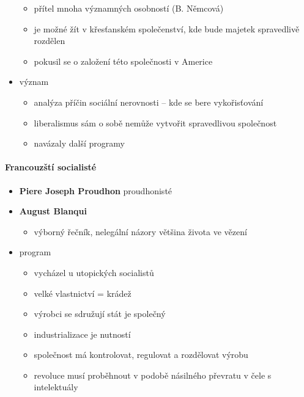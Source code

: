 \begin{itemize}
\begin{itemize}
	\item přítel mnoha významných osobností (B. Němcová)
	\item je možné žít v křesťanském společenství, kde bude majetek spravedlivě rozdělen
	\item pokusil se o založení této společnosti v Americe
	\end{itemize}
\item význam
	\begin{itemize}
	\item analýza příčin sociální nerovnosti -- kde se bere vykořisťování
	\item liberalismus sám o sobě nemůže vytvořit spravedlivou společnost
	\item navázaly další programy
	\end{itemize}
\end{itemize}

\paragraph{Francouzští socialisté}
\begin{itemize}
\item \textbf{Piere Joseph Proudhon} \ra proudhonisté
\item \textbf{August Blanqui}
	\begin{itemize}
	\item výborný řečník, nelegální názory \ra většina života ve vězení
	\end{itemize}
\item program
	\begin{itemize}
	\item vycházel u utopických socialistů
	\item velké vlastnictví = krádež
	\item výrobci se sdružují \ra stát je společný
	\item industrializace je nutností
	\item společnost má kontrolovat, regulovat a rozdělovat výrobu 
	\item revoluce musí proběhnout v podobě násilného převratu v čele s intelektuály
	\end{itemize}
\end{itemize}

